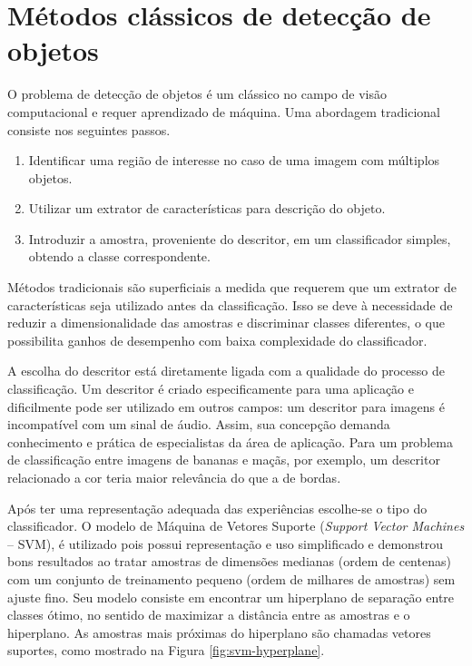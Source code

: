 \section{Métodos clássicos de detecção de objetos}
O problema de detecção de objetos é um clássico no campo de visão computacional e requer aprendizado de máquina. Uma abordagem tradicional \cite{traditional-objdetect} consiste nos seguintes passos.
	\begin{enumerate}
	\item Identificar uma região de interesse no caso de uma imagem com múltiplos objetos.
	\item Utilizar um extrator de características para descrição do objeto.
	\item Introduzir a amostra, proveniente do descritor, em um classificador simples, obtendo a classe correspondente.
	\end{enumerate}

Métodos tradicionais são superficiais a medida que requerem que um extrator de características seja utilizado antes da classificação. Isso se deve à necessidade de reduzir a dimensionalidade das amostras e discriminar classes diferentes, o que possibilita ganhos de desempenho com baixa complexidade do classificador.

A escolha do descritor está diretamente ligada com a qualidade do processo de classificação. Um descritor é criado especificamente para uma aplicação e dificilmente pode ser utilizado em outros campos: um descritor para imagens é incompatível com um sinal de áudio. Assim, sua concepção demanda conhecimento e prática de especialistas da área de aplicação. Para um problema de classificação entre imagens de bananas e maçãs, por exemplo, um descritor relacionado a cor teria maior relevância do que a de bordas.

Após ter uma representação adequada das experiências escolhe-se o tipo do classificador. O modelo de Máquina de Vetores Suporte (\textit{Support Vector Machines} -- SVM), é utilizado pois possui representação e uso simplificado e demonstrou bons resultados \cite{smith2001svm} ao tratar amostras de dimensões medianas (ordem de centenas) com um conjunto de treinamento pequeno (ordem de milhares de amostras) sem ajuste fino. Seu modelo consiste em encontrar um hiperplano de separação entre classes ótimo, no sentido de maximizar a distância entre as amostras e o hiperplano. As amostras mais próximas do hiperplano são chamadas vetores suportes, como mostrado na Figura \ref{fig:svm-hyperplane}.

